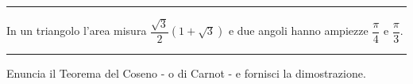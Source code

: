 \documentclass[12pt, a4paper]{exam}
\begin{document}
\begin{questions}

  \hrule
\addpoints
\question[4] In un triangolo l'area misura $\dfrac{\sqrt{3}}{2}(1+ \sqrt{3})$ e due angoli hanno ampiezze $\dfrac{\pi}{4}$ e $\dfrac{\pi}{3}$.\\
    \begin{center}
  \end{center}
  \vspace{10pt}
  \vfill
  \rule[.1ex]{\textwidth}{0.3pt}
   Enuncia il Teorema del Coseno - o di Carnot - e fornisci la dimostrazione.

  \vspace{10pt}
    \begin{center}
  \end{center}
  \vspace{10pt}
  \vspace{15pt}
\end{questions}
\newpage
\end{document}
